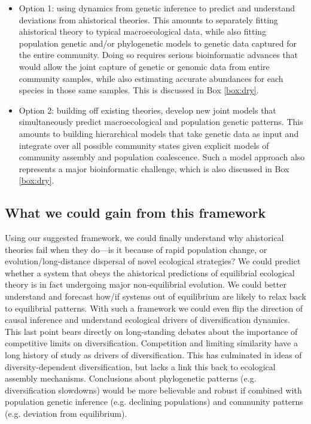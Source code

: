 \documentclass[12pt]{article}
\newcounter{Box}
\begin{document}
\begin{itemize}
\item Option 1: using dynamics from genetic inference to predict and
  understand deviations from ahistorical theories. This amounts to
  separately fitting ahistorical theory to typical macroecological
  data, while also fitting population genetic
  and/or phylogenetic models to genetic data captured
  for the entire community. Doing so requires serious bioinformatic
  advances that would allow the joint capture of genetic or genomic
  data from entire community samples, while also estimating accurate
  abundances for each species in those same samples. This is discussed
  in Box \ref{box:dry}.
\item Option 2: building off existing theories, develop new joint
  models that simultaneously predict macroecological and population
  genetic patterns. This amounts to building hierarchical models that
  take genetic data as input and integrate over all possible community
  states given explicit models of community assembly and population
  coalescence. Such a model approach also represents a major
  bioinformatic challenge, which is also discussed in Box
  \ref{box:dry}.
\end{itemize}

\subsection{What we could gain from this framework}

Using our suggested framework, we could finally understand why ahistorical theories fail when
they do---is it because of rapid population change, or
evolution/long-distance dispersal of novel ecological strategies? We
could predict whether a system that obeys the ahistorical predictions
of equilibrial ecological theory is in fact undergoing major
non-equilibrial evolution. We could better understand and forecast
how/if systems out of equilibrium are likely to relax back to
equilibrial patterns. With such a framework we could even flip the
direction of causal inference and understand ecological drivers of
diversification dynamics. This last point bears directly on
long-standing  debates about the importance of competitive
limits on diversification. Competition and limiting similarity have a
long history of study as drivers of diversification. This has
culminated in ideas of diversity-dependent
diversification\citep{Etienne2012-ky, Rabosky2013-gk, Rabosky2008-bs}, but lacks a
 link this back to ecological assembly
mechanisms. Conclusions about phylogenetic patterns (e.g. diversification
slowdowns) would be more believable and robust if combined with
population genetic inference (e.g. declining populations) and
community patterns (e.g.  deviation from equilibrium).
\end{document}

